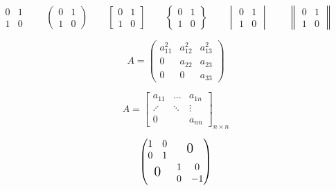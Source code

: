\documentclass{article} %
\begin{document}
	\[	%
	\begin{matrix}
		0 & 1 \\
		1 & 0
	\end{matrix}	\qquad
	\begin{pmatrix}		%
	0 & 1 \\
	1 & 0
	\end{pmatrix}	\qquad
	\begin{bmatrix}		%
	0 & 1 \\
	1 & 0
	\end{bmatrix}	\qquad
	\begin{Bmatrix}		%
	0 & 1 \\
	1 & 0
	\end{Bmatrix}	\qquad
	\begin{vmatrix}		%
	0 & 1 \\
	1 & 0
	\end{vmatrix}	\qquad
	\begin{Vmatrix}		%
	0 & 1 \\
	1 & 0
	\end{Vmatrix}	\qquad
	\]
	
	\[
	A = \begin{pmatrix}
		a_{11}^2 & a_{12}^2 & a_{13}^2 \\
		0 & a_{22} & a_{23} \\
		0 & 0 & a_{33}
	\end{pmatrix}
	\]
	
	\[
	A= \begin{bmatrix}
		a_{11} & \dots & a_{1n} \\
		\iddots & \ddots & \vdots \\  %
		0 & & a_{nn}
	\end{bmatrix}_{n \times n}
	\]
	
	\[
	\begin{pmatrix}
		\begin{matrix}
			1&0\\0&1
		\end{matrix} & \text{\Large 0} \\	%
	\text{\Large 0} & \begin{matrix}
		1&0\\0&-1\end{matrix}
	\end{pmatrix}
	\]
	
\end{document}
